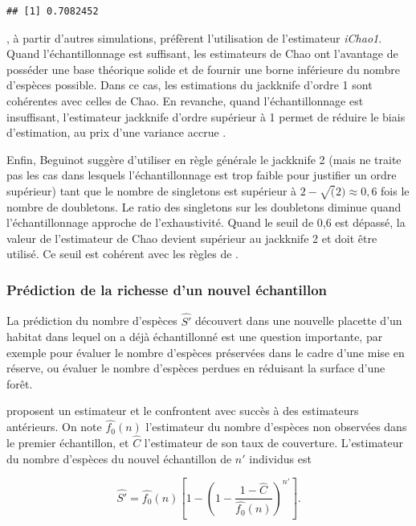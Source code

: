 \documentclass[
  11pt,
  american,
  a4paper,
  extrafontsizes,onecolumn,openright
  ]{memoir}
\newlength{\rf}
\begin{document}
\begin{verbatim}
## [1] 0.7082452
\end{verbatim}

\normalsize

\textcite{Chiu2014a}, à partir d'autres simulations, préfèrent l'utilisation de l'estimateur \emph{iChao1}.
Quand l'échantillonnage est suffisant, les estimateurs de Chao ont l'avantage de posséder une base théorique solide et de fournir une borne inférieure du nombre d'espèces possible.
Dans ce cas, les estimations du jackknife d'ordre 1 sont cohérentes avec celles de Chao.
En revanche, quand l'échantillonnage est insuffisant, l'estimateur jackknife d'ordre supérieur à 1 permet de réduire le biais d'estimation, au prix d'une variance accrue \autocite{Marcon2015a}.

Enfin, Beguinot \autocite*{Beguinot2015a,Beguinot2016} suggère d'utiliser en règle générale le jackknife 2 (mais ne traite pas les cas dans lesquels l'échantillonnage est trop faible pour justifier un ordre supérieur) tant que le nombre de singletons est supérieur à \(2-\sqrt(2) \approx 0,6\) fois le nombre de doubletons.
Le ratio des singletons sur les doubletons diminue quand l'échantillonnage approche de l'exhaustivité.
Quand le seuil de 0,6 est dépassé, la valeur de l'estimateur de Chao devient supérieur au jackknife 2 et doit être utilisé.
Ce seuil est cohérent avec les règles de \textcite{Brose2003}.

\hypertarget{sec-Extrapol}{%
\subsubsection{Prédiction de la richesse d'un nouvel échantillon}\label{sec-Extrapol}}

La prédiction du nombre d'espèces \(\hat{S'}\) découvert dans une nouvelle placette d'un habitat dans lequel on a déjà échantillonné est une question importante, par exemple pour évaluer le nombre d'espèces préservées dans le cadre d'une mise en réserve, ou évaluer le nombre d'espèces perdues en réduisant la surface d'une forêt.

\textcite{Shen2003} proposent un estimateur et le confrontent avec succès à des estimateurs antérieurs.
On note \(\hat{f_0}(n)\) l'estimateur du nombre d'espèces non observées dans le premier échantillon, et \(\hat{C}\) l'estimateur de son taux de couverture.
L'estimateur du nombre d'espèces du nouvel échantillon de \(n'\) individus est

\begin{equation}
  \hat{S'} 
  = \hat{f_0}(n) \left[ 
    1 - {\left( 1 - \frac{1 - \hat{C}}{\hat{f_0}(n)} \right)}^{n'} 
  \right].
\end{equation}
\end{document}

